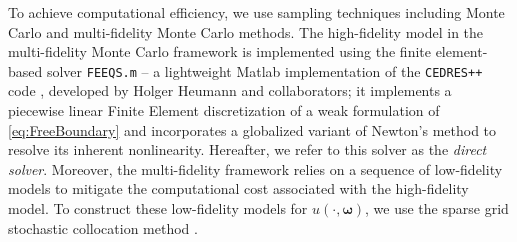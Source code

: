 To achieve computational efficiency, we use sampling techniques including Monte Carlo and multi-fidelity Monte Carlo methods. The high-fidelity model in the multi-fidelity Monte Carlo framework is implemented using the finite element-based solver {\tt FEEQS.m} \cite{Heumann:feeqsm} -- a lightweight Matlab implementation of the {\tt CEDRES++} code \cite{FaHe:2017,CEDRES}, developed by Holger Heumann and collaborators; it implements a piecewise linear Finite Element discretization of a weak formulation of \eqref{eq:FreeBoundary} and incorporates a globalized variant of Newton's method to resolve its inherent nonlinearity. Hereafter, we refer to this solver as the  {\it direct solver}. Moreover, the multi-fidelity framework relies on a sequence of low-fidelity models to mitigate the computational cost associated with the high-fidelity model. To construct these low-fidelity models for $u(\cdot, \boldsymbol{\omega})$, we use the sparse grid stochastic collocation method \cite{BaNoRi:2000, KlBa:2005, MaNi:2009, Sm:1963}.






